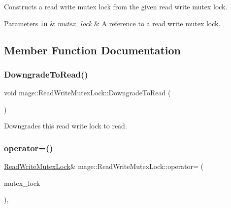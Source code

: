 Constructs a read write mutex lock from the given read write mutex lock.


\begin{DoxyParams}[1]{Parameters}
\mbox{\tt in}  & {\em mutex\+\_\+lock} & A reference to a read write mutex lock. \\
\hline
\end{DoxyParams}


\subsection{Member Function Documentation}
\hypertarget{structmage_1_1_read_write_mutex_lock_ad3292e579d09107c7361989657b9bade}{}\label{structmage_1_1_read_write_mutex_lock_ad3292e579d09107c7361989657b9bade} 
\subsubsection{\texorpdfstring{Downgrade\+To\+Read()}{DowngradeToRead()}}
{\footnotesize\ttfamily void mage\+::\+Read\+Write\+Mutex\+Lock\+::\+Downgrade\+To\+Read (\begin{DoxyParamCaption}{ }\end{DoxyParamCaption})}

Downgrades this read write lock to read. \hypertarget{structmage_1_1_read_write_mutex_lock_ade82a57f337e39a1515f67fbc1f6fc43}{}\label{structmage_1_1_read_write_mutex_lock_ade82a57f337e39a1515f67fbc1f6fc43} 
\subsubsection{\texorpdfstring{operator=()}{operator=()}}
{\footnotesize\ttfamily \hyperlink{structmage_1_1_read_write_mutex_lock}{Read\+Write\+Mutex\+Lock}\& mage\+::\+Read\+Write\+Mutex\+Lock\+::operator= (\begin{DoxyParamCaption}\item[{const \hyperlink{structmage_1_1_read_write_mutex_lock}{Read\+Write\+Mutex\+Lock} \&}]{mutex\+\_\+lock }\end{DoxyParamCaption})\hspace{0.3cm}{\ttfamily [private]}, {\ttfamily [delete]}}


